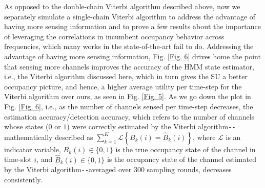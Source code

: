 \documentclass[12pt, draftcls, onecolumn]{IEEEtran}
\begin{document}
As opposed to the double-chain Viterbi algorithm described above, now we separately simulate a single-chain Viterbi algorithm to address the advantage of having more sensing information and to prove a few results about the importance of leveraging the correlations in incumbent occupancy behavior across frequencies, which many works in the state-of-the-art fail to do. Addressing the advantage of having more sensing information, Fig. \ref{Fig. 6} drives home the point that sensing more channels improves the accuracy of the HMM state estimator, i.e., the Viterbi algorithm discussed here, which in turn gives the SU a better occupancy picture, and hence, a higher average utility per time-step for the Viterbi algorithm over ours, as seen in Fig. \ref{Fig. 5}. As we go down the plot in Fig. \ref{Fig. 6}, i.e., as the number of channels sensed per time-step decreases, the estimation accuracy/detection accuracy, which refers to the number of channels whose states ($0$ or $1$) were correctly estimated by the Viterbi algorithm\texttt{-{}-}mathematically described as $\sum_{k{=}1}^{K}\mathcal{L}\left\{B_{k}(i){=}\hat{B}_{k}(i)\right\}$, where $\mathcal{L}$ is an indicator variable, $B_{k}(i){\in}\{0,1\}$ is the true occupancy state of the channel in time-slot $i$, and $\hat{B}_{k}(i){\in}\{0,1\}$ is the occupancy state of the channel estimated by the Viterbi algorithm\texttt{-{}-}averaged over $300$ sampling rounds, decreases consistently.
\end{document}
